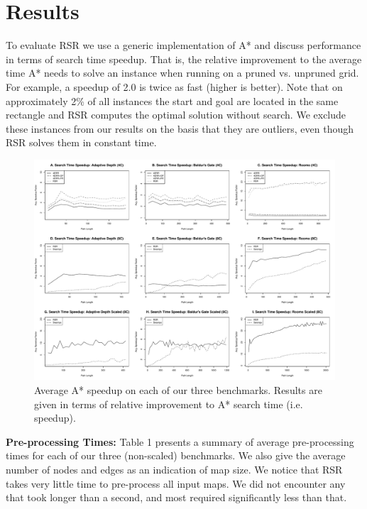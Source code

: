 \section{Results}
\label{cha::rsr::results}
To evaluate RSR we use a generic implementation of A* and discuss performance 
in terms of search time speedup. That is, the relative improvement to the average 
time A* needs to solve an instance when running on a pruned  vs. unpruned grid.
For example, a speedup of 2.0 is twice as fast (higher is better).
Note that on approximately 2\% of all instances the start and goal are located
in the same rectangle and RSR computes the optimal solution without
search.  We exclude these instances from our results on the basis that they are 
outliers, even though RSR solves them in constant time.

\par 
\begin{figure}[t]
\begin{center}
   \includegraphics[width=0.97\columnwidth, trim = 10mm 10mm 10mm 0mm]{chapter_rsr/diagrams/speedup.pdf}
\end{center}
\caption{Average A* speedup on each of our three benchmarks. 
Results are given in terms of relative improvement to A* search time (i.e. speedup).}
\label{fig::rsr::speedup}
\end{figure}


\textbf{Pre-processing Times: } 
Table 1 presents a summary of average pre-processing times for
each of our three (non-scaled) benchmarks. We also give the average number of
nodes and edges as an indication of map size.
We notice that RSR takes very little time to pre-process all input maps. 
We did not encounter any that took longer than a second, and most required 
significantly less than that. 

